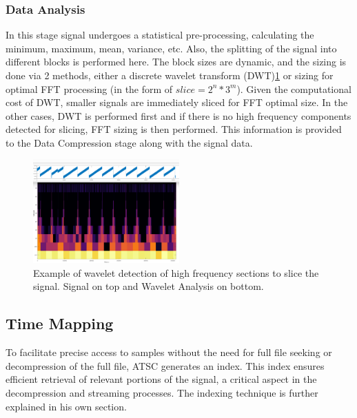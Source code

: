 \documentclass[conference]{IEEEtran}
\begin{document}
\subsubsection{Data Analysis}
In this stage signal undergoes a statistical pre-processing, calculating the minimum, maximum, mean, variance, etc.
Also, the splitting of the signal into different blocks is performed here.
The block sizes are dynamic, and the sizing is done via 2 methods, either a discrete wavelet transform (DWT)\ref{wavelet} or sizing for optimal FFT processing (in the form of $slice = 2^n * 3^m$).
Given the computational cost of DWT, smaller signals are immediately sliced for FFT optimal size. In the other cases, DWT is performed first and if there is no high frequency components detected for slicing, FFT sizing is then performed.
This information is provided to the Data Compression stage along with the signal data.

\begin{figure}[ht]
  \centering
  \includegraphics[width=0.5\textwidth]{wavelet_heap.png}
  \caption{Example of wavelet detection of high frequency sections to slice the signal. Signal on top and Wavelet Analysis on bottom.}
  \label{wavelet}
\end{figure}

\subsection{Time Mapping}
To facilitate precise access to samples without the need for full file seeking or decompression of the full file, ATSC generates an index. This index ensures efficient retrieval of relevant portions of the signal, a critical aspect in the decompression and streaming processes.
The indexing technique is further explained in his own section.
\end{document}
